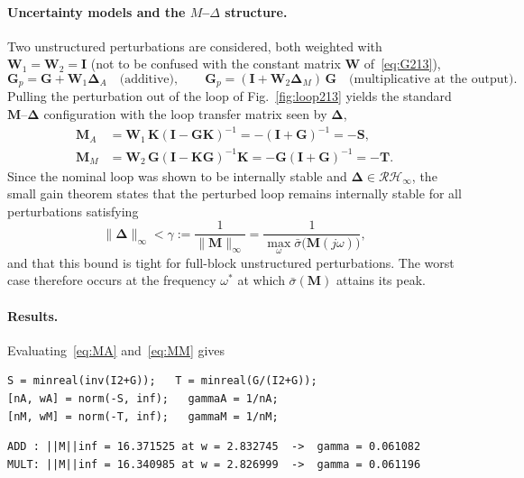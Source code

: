 \paragraph{Uncertainty models and the $M$--$\Delta$ structure.} Two unstructured perturbations
are considered, both weighted with $\mathbf{W}_1=\mathbf{W}_2=\mathbf{I}$ (not to be confused
with the constant matrix $\mathbf{W}$ of~\eqref{eq:G213}),
\begin{equation}
    \mathbf{G}_p = \mathbf{G} + \mathbf{W}_1\boldsymbol{\Delta}_A
    \quad\text{(additive)},
    \qquad
    \mathbf{G}_p = (\mathbf{I}+\mathbf{W}_2\boldsymbol{\Delta}_M)\,\mathbf{G}
    \quad\text{(multiplicative at the output)} .
    \label{eq:uncertainty}
\end{equation}
Pulling the perturbation out of the loop of Fig.~\ref{fig:loop213} yields the standard
$\mathbf{M}$--$\boldsymbol{\Delta}$ configuration with the loop transfer matrix seen by
$\boldsymbol{\Delta}$,
\begin{align}
    \mathbf{M}_A &= \mathbf{W}_1\,\mathbf{K}(\mathbf{I}-\mathbf{G}\mathbf{K})^{-1}
                  = -(\mathbf{I}+\mathbf{G})^{-1} = -\mathbf{S},
                  \label{eq:MA}\\
    \mathbf{M}_M &= \mathbf{W}_2\,\mathbf{G}(\mathbf{I}-\mathbf{K}\mathbf{G})^{-1}\mathbf{K}
                  = -\mathbf{G}(\mathbf{I}+\mathbf{G})^{-1} = -\mathbf{T}.
                  \label{eq:MM}
\end{align}
Since the nominal loop was shown to be internally stable and
$\boldsymbol{\Delta}\in\mathcal{RH}_\infty$, the small gain theorem states that the perturbed
loop remains internally stable for all perturbations satisfying
\begin{equation}
    \|\boldsymbol{\Delta}\|_\infty < \gamma := \frac{1}{\|\mathbf{M}\|_\infty}
    = \frac{1}{\max_\omega\bar{\sigma}\big(\mathbf{M}(j\omega)\big)} ,
    \label{eq:smallgain}
\end{equation}
and that this bound is tight for full-block unstructured perturbations. The worst case therefore
occurs at the frequency $\omega^*$ at which $\bar{\sigma}(\mathbf{M})$ attains its peak.

\paragraph{Results.} Evaluating~\eqref{eq:MA} and~\eqref{eq:MM} gives

\begin{lstlisting}
S = minreal(inv(I2+G));   T = minreal(G/(I2+G));
[nA, wA] = norm(-S, inf);   gammaA = 1/nA;
[nM, wM] = norm(-T, inf);   gammaM = 1/nM;
\end{lstlisting}
\begin{lstlisting}[style=matlabout]
ADD : ||M||inf = 16.371525 at w = 2.832745  ->  gamma = 0.061082
MULT: ||M||inf = 16.340985 at w = 2.826999  ->  gamma = 0.061196
\end{lstlisting}

